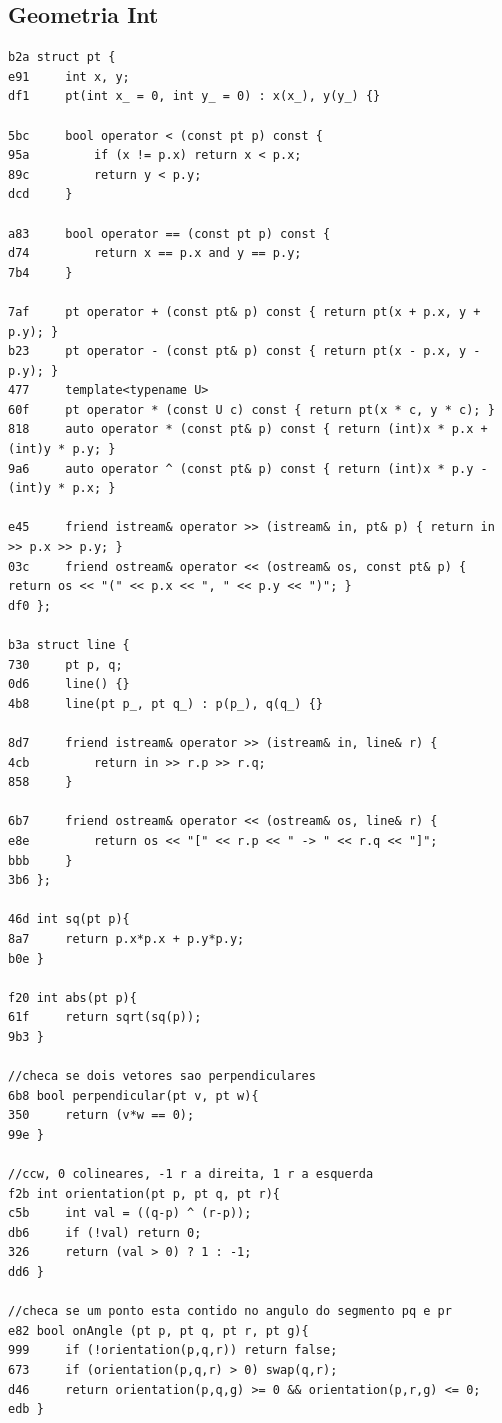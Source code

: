 \documentclass[11pt, a4paper, twoside]{article}
\begin{document}
\subsection{Geometria Int}
\begin{lstlisting}
b2a struct pt {
e91     int x, y;
df1     pt(int x_ = 0, int y_ = 0) : x(x_), y(y_) {}
    
5bc     bool operator < (const pt p) const {
95a 		if (x != p.x) return x < p.x;
89c 		return y < p.y;
dcd 	}
    
a83 	bool operator == (const pt p) const {
d74 		return x == p.x and y == p.y;
7b4 	}
    
7af     pt operator + (const pt& p) const { return pt(x + p.x, y + p.y); }
b23     pt operator - (const pt& p) const { return pt(x - p.x, y - p.y); }
477     template<typename U>
60f     pt operator * (const U c) const { return pt(x * c, y * c); }
818     auto operator * (const pt& p) const { return (int)x * p.x + (int)y * p.y; }
9a6     auto operator ^ (const pt& p) const { return (int)x * p.y - (int)y * p.x; }
    
e45     friend istream& operator >> (istream& in, pt& p) { return in >> p.x >> p.y; }
03c     friend ostream& operator << (ostream& os, const pt& p) { return os << "(" << p.x << ", " << p.y << ")"; }
df0 };

b3a struct line {
730 	pt p, q;
0d6 	line() {}
4b8 	line(pt p_, pt q_) : p(p_), q(q_) {}
        
8d7     friend istream& operator >> (istream& in, line& r) {
4cb 		return in >> r.p >> r.q;
858 	}
    
6b7     friend ostream& operator << (ostream& os, line& r) {
e8e 		return os << "[" << r.p << " -> " << r.q << "]";
bbb 	}
3b6 };

46d int sq(pt p){
8a7     return p.x*p.x + p.y*p.y;
b0e }

f20 int abs(pt p){
61f     return sqrt(sq(p));
9b3 }

//checa se dois vetores sao perpendiculares
6b8 bool perpendicular(pt v, pt w){
350     return (v*w == 0);
99e }

//ccw, 0 colineares, -1 r a direita, 1 r a esquerda
f2b int orientation(pt p, pt q, pt r){
c5b     int val = ((q-p) ^ (r-p));
db6     if (!val) return 0;
326     return (val > 0) ? 1 : -1;
dd6 }

//checa se um ponto esta contido no angulo do segmento pq e pr
e82 bool onAngle (pt p, pt q, pt r, pt g){
999     if (!orientation(p,q,r)) return false;
673     if (orientation(p,q,r) > 0) swap(q,r);
d46     return orientation(p,q,g) >= 0 && orientation(p,r,g) <= 0; 
edb }


\end{lstlisting}
\end{document}
